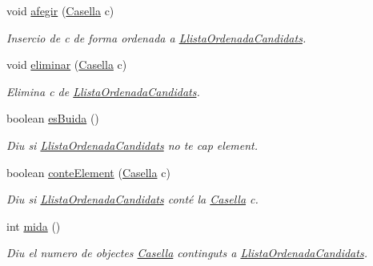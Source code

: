 \begin{DoxyCompactItemize}
void \hyperlink{classlogica_1_1algoritmica_1_1_llista_ordenada_candidats_a047df4631890e7efea712ab7d711b715}{afegir} (\hyperlink{classlogica_1_1algoritmica_1_1_casella}{Casella} c)
\begin{DoxyCompactList}\small\item\em Insercio de c de forma ordenada a \hyperlink{classlogica_1_1algoritmica_1_1_llista_ordenada_candidats}{Llista\+Ordenada\+Candidats}. \end{DoxyCompactList}\item 
void \hyperlink{classlogica_1_1algoritmica_1_1_llista_ordenada_candidats_a66435e469e8d188173b8539aac7efd5b}{eliminar} (\hyperlink{classlogica_1_1algoritmica_1_1_casella}{Casella} c)
\begin{DoxyCompactList}\small\item\em Elimina c de \hyperlink{classlogica_1_1algoritmica_1_1_llista_ordenada_candidats}{Llista\+Ordenada\+Candidats}. \end{DoxyCompactList}\item 
boolean \hyperlink{classlogica_1_1algoritmica_1_1_llista_ordenada_candidats_ac65c7847f389c4a729256d6f56250c32}{es\+Buida} ()
\begin{DoxyCompactList}\small\item\em Diu si \hyperlink{classlogica_1_1algoritmica_1_1_llista_ordenada_candidats}{Llista\+Ordenada\+Candidats} no te cap element. \end{DoxyCompactList}\item 
boolean \hyperlink{classlogica_1_1algoritmica_1_1_llista_ordenada_candidats_a211e94e69348c4e3c6a5a64991ee4364}{conte\+Element} (\hyperlink{classlogica_1_1algoritmica_1_1_casella}{Casella} c)
\begin{DoxyCompactList}\small\item\em Diu si \hyperlink{classlogica_1_1algoritmica_1_1_llista_ordenada_candidats}{Llista\+Ordenada\+Candidats} conté la \hyperlink{classlogica_1_1algoritmica_1_1_casella}{Casella} c. \end{DoxyCompactList}\item 
int \hyperlink{classlogica_1_1algoritmica_1_1_llista_ordenada_candidats_aa9b91dbc941f9693f2f896a4088a63d4}{mida} ()
\begin{DoxyCompactList}\small\item\em Diu el numero de objectes \hyperlink{classlogica_1_1algoritmica_1_1_casella}{Casella} continguts a \hyperlink{classlogica_1_1algoritmica_1_1_llista_ordenada_candidats}{Llista\+Ordenada\+Candidats}. \end{DoxyCompactList}\end{DoxyCompactItemize}


